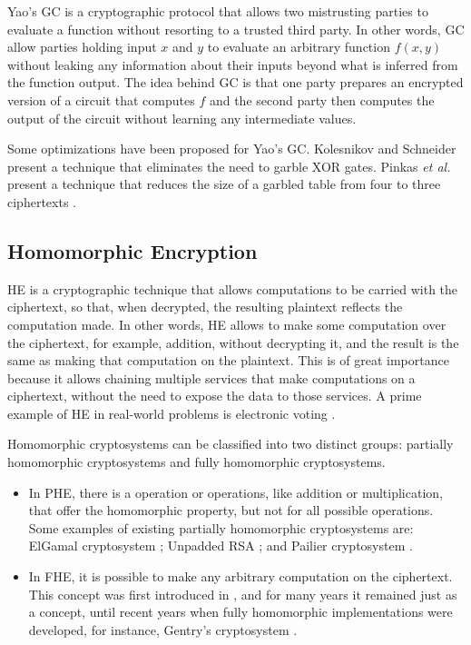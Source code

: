 Yao's \acf{GC} \cite{yao1986generate} is a cryptographic protocol that allows two mistrusting parties to evaluate a function without resorting to a trusted third party. In other words, \ac{GC} allow parties holding input $x$ and $y$ to evaluate an arbitrary function $f(x,y)$ without leaking any information about their inputs beyond what is inferred from the function output. The idea behind \ac{GC} is that one party prepares an encrypted version of a circuit that computes $f$ and the second party then computes the output of the circuit without learning any intermediate values.

Some optimizations have been proposed for Yao's \ac{GC}. Kolesnikov and Schneider \cite{kolesnikov2008improved} present a technique that eliminates the need to garble XOR gates. Pinkas \textit{et al.} present a technique that reduces the size of a garbled table from four to three ciphertexts \cite{pinkas2009secure}.


\subsection{Homomorphic Encryption}
\label{ssec:HomomorphicEncryption}


\acf{HE} \cite{rivest1978data} is a cryptographic technique that allows computations to be carried with the ciphertext, so that, when decrypted, the resulting plaintext reflects the computation made. In other words, \ac{HE} allows to make some computation over the ciphertext, for example, addition, without decrypting it, and the result is the same as making that computation on the plaintext. This is of great importance because it allows chaining multiple services that make computations on a ciphertext, without the need to expose the data to those services. A prime example of \ac{HE} in real-world problems is electronic voting \cite{hirt2000efficient}.

Homomorphic cryptosystems can be classified into two distinct groups: partially homomorphic cryptosystems and fully homomorphic cryptosystems.

\begin{itemize}
    \setlength\itemsep{1em}
    \item In \ac{PHE}, there is a operation or operations, like addition or multiplication, that offer the homomorphic property, but not for all possible operations. Some examples of existing partially homomorphic cryptosystems are:
    ElGamal cryptosystem \cite{elgamal1985public}; Unpadded RSA \cite{rivest1978method}; and Pailier cryptosystem \cite{paillier1999public}.

    \item In \ac{FHE}, it is possible to make any arbitrary computation on the ciphertext. This concept was first introduced in \cite{rivest1978data}, and for many years it remained just as a concept, until recent years when fully homomorphic implementations were developed, for instance, Gentry's cryptosystem \cite{gentry2009fully}.
\end{itemize}


